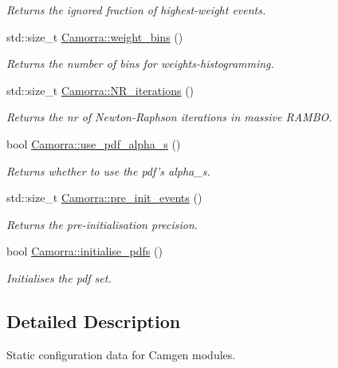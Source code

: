 \begin{DoxyCompactItemize}
\begin{DoxyCompactList}\small\item\em Returns the ignored fraction of highest-\/weight events. \end{DoxyCompactList}\item 
\hypertarget{a00798_a412ab190d3943e5c209049473462388c}{
std::size\_\-t \hyperlink{a00798_a412ab190d3943e5c209049473462388c}{Camorra::weight\_\-bins} ()}
\label{a00798_a412ab190d3943e5c209049473462388c}

\begin{DoxyCompactList}\small\item\em Returns the number of bins for weights-\/histogramming. \end{DoxyCompactList}\item 
\hypertarget{a00798_a26ad4e0b5a59c164e61f5abfec49b85f}{
std::size\_\-t \hyperlink{a00798_a26ad4e0b5a59c164e61f5abfec49b85f}{Camorra::NR\_\-iterations} ()}
\label{a00798_a26ad4e0b5a59c164e61f5abfec49b85f}

\begin{DoxyCompactList}\small\item\em Returns the nr of Newton-\/Raphson iterations in massive RAMBO. \end{DoxyCompactList}\item 
\hypertarget{a00798_a48798cc08aaebcd575365d42bf1a8dc6}{
bool \hyperlink{a00798_a48798cc08aaebcd575365d42bf1a8dc6}{Camorra::use\_\-pdf\_\-alpha\_\-s} ()}
\label{a00798_a48798cc08aaebcd575365d42bf1a8dc6}

\begin{DoxyCompactList}\small\item\em Returns whether to use the pdf's alpha\_\-s. \end{DoxyCompactList}\item 
\hypertarget{a00798_acb5e5f827904dec106266f7d2d1b1fba}{
std::size\_\-t \hyperlink{a00798_acb5e5f827904dec106266f7d2d1b1fba}{Camorra::pre\_\-init\_\-events} ()}
\label{a00798_acb5e5f827904dec106266f7d2d1b1fba}

\begin{DoxyCompactList}\small\item\em Returns the pre-\/initialisation precision. \end{DoxyCompactList}\item 
bool \hyperlink{a00798_a10faaa355725620453fd5aa6cf7e2832}{Camorra::initialise\_\-pdfs} ()
\begin{DoxyCompactList}\small\item\em Initialises the pdf set. \end{DoxyCompactList}\end{DoxyCompactItemize}


\subsection{Detailed Description}
Static configuration data for Camgen modules. 